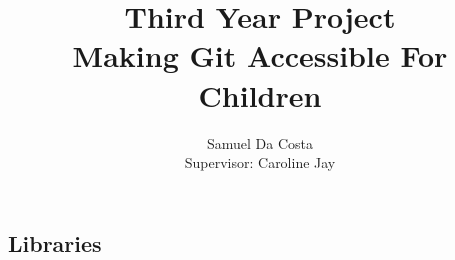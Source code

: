 \documentclass[a4paper]{report}
\begin{document}
\newcommand{\commit}[0]{\texttt{commit }}
\newcommand{\fig}[4]{

\begin{figure} 
    \centering
    \texttt{[image: \#1]}
    \caption{#2}
    \label{#3}
\end{figure}


}

\title{Third Year Project \\
\large Making Git Accessible For Children \\
}
\author{Samuel Da Costa\\
Supervisor: Caroline Jay}
\maketitle
\tableofcontents

\begin{abstract}

\end{abstract}







\begin{appendices}

\chapter{Libraries}\label{appendix_libraries}



\end{appendices}



\end{document}
